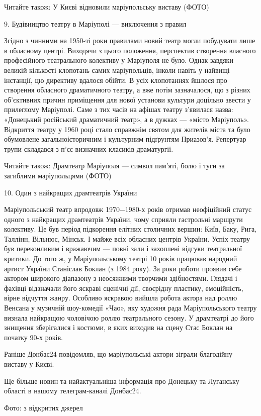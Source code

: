 Читайте також: У Києві відновили маріупольську виставу (ФОТО)

9. Будівництво театру в Маріуполі — виключення з правил

Згідно з чинними на 1950-ті роки правилами новий театр могли побудувати лише в
обласному центрі. Виходячи з цього положення, перспектив створення власного
професійного театрального колективу у Маріуполя не було. Однак завдяки великій
кількості клопотань самих маріупольців, інколи навіть у найвищі інстанції, цю
директиву вдалося обійти. В усіх клопотаннях йшлося про створення обласного
драматичного театру, а вже потім зазначалося, що з різних об'єктивних причин
приміщення для нової установи культури доцільно звести у прилеглому Маріуполі.
Саме з тих часів на афішах театру з'явилася назва: «Донецький російський
драматичний театр», а в дужках — «місто Маріуполь». Відкриття театру у 1960
році стало справжнім святом для жителів міста та було обумовлене
загальноісторичним і культурним підґрунтям Приазов'я. Репертуар трупи складався
з п'єс визначних класиків драматургії.

Читайте також: Драмтеатр Маріуполя — символ пам'яті, болю і туги за загиблими
маріупольцями (ФОТО)

10. Один з найкращих драмтеатрів України

Маріупольський театр впродовж 1970−1980-х років отримав неофіційний статус
одного з найкращих драмтеатрів України, чому сприяли гастрольні маршрути
колективу. Це був період підкорення елітних столичних вершин: Київ, Баку, Рига,
Таллінн, Вільнюс, Мінськ. І майже всіх обласних центрів України. Успіх театру
був переконливим і вражаючим — повні зали і захоплені відгуки театральної
критики. До того ж, у Маріупольському театрі 10 років працював народний артист
України Станіслав Боклан (з 1984 року). За роки роботи проявив себе актором
широкого діапазону з неосяжними творчими здібностями. Глядачі і фахівці
відзначали його яскраві сценічні дії, своєрідну пластику, емоційність, вірне
відчуття жанру. Особливо яскравою вийшла робота актора над роллю Венсана у
музичній шоу-комедії «Чао», яку художня рада Маріупольського театру визнала
найкращою чоловічою роллю театрального сезону. У драмтеатрі до його знищення
зберігалися і костюми, в яких виходив на сцену Стас Боклан на початку 90-х
років.


Раніше Донбас24 повідомляв, що маріупольські актори зіграли благодійну виставу
у Києві.

Ще більше новин та найактуальніша інформація про Донецьку та Луганську області
в нашому телеграм-каналі Донбас24.

Фото: з відкритих джерел
